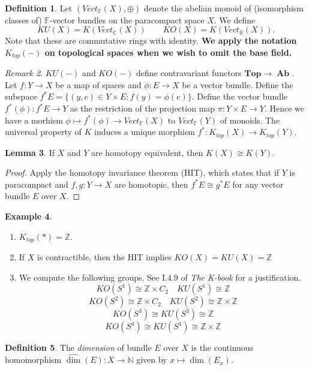 \documentclass[10pt,letterpaper,cm]{nupset}
\theoremstyle{definition}
\newtheorem{definition}{Definition}
\newtheorem{exmp}[definition]{Example}
\theoremstyle{theorem}
\newtheorem{lemma}[definition]{Lemma}
\theoremstyle{remark}
\newtheorem{remark}[definition]{Remark}
\newcommand{\C}{\mathbb C}
\newcommand{\F}{\mathbb F}
\newcommand{\N}{\mathbb N}
\newcommand{\R}{\mathbb R}
\newcommand{\Z}{\mathbb Z}
\newcommand{\1}{\mathbf{1}}
\newcommand{\0}{\vec 0}
\DeclareMathOperator{\Ab}{\mathbf{Ab}}
\begin{document}
\begin{definition}
Let $(Vect_{\F}(X), \oplus)$ denote the abelian monoid of (isomorphism classes of) $\F$-vector bundles on the paracompact space $X$. We define $$KU(X) = K(Vect_{\C}(X)) \quad \quad KO(X) = K(Vect_{\R}(X)).$$ Note that these are commutative rings with identity. \textbf{We apply the notation $K_{top}(-)$ on topological spaces when we wish to omit the base field.}
\end{definition}

\begin{remark}
$KU(-)$ and $KO(-)$ define contravariant functors $\mathbf{Top} \to \Ab$. Let $f: Y \to X$ be a map of spaces and $\phi : E \to X$ be a vector bundle. Define the subspace $f^{\ast}E = \{(y, e) \in Y \times E : f(y) = \phi(e)\}$.  Define the vector bundle $f^{\ast}(\phi) : f^{\ast}E \to Y$ as the restriction of the projection map $\pi : Y \times E \to Y$. Hence we have a morhism $\phi \mapsto f^{\ast}(\phi) \to Vect_{\F}(X)$ to $Vect_{\F}(Y)$ of monoids. The universal property of $K$ induces a unique morphism $f^{\ast}: K_{top}(X) \to K_{top}(Y)$.
\end{remark}

\begin{lemma}
If $X$ and $Y$ are homotopy equivalent, then $K(X) \cong K(Y)$.
\end{lemma}
\begin{proof}
Apply the homotopy invariance theorem (HIT), which states that if $Y$ is paracompact and $f, g: Y \to X$ are homotopic, then $f^{\ast}E \cong g^{\ast}E$ for any vector bundle $E$ over $X$.
\end{proof}

\begin{exmp} $ $
\begin{enumerate}
\item $K_{top}(\ast) = \Z$.
\item If $X$ is contractible, then the HIT implies $KO(X) = KU(X) = \Z$
\item We compute the following groups. See I.4.9 of \textit{The K-book} for a justification.
$$KO(S^1) \cong \Z \times C_2 \quad KU(S^1) \cong \Z$$ $$KO(S^2) \cong \Z \times C_2   \quad KU(S^2) \cong \Z \times \Z$$  $$KO(S^3) \cong KU(S^3) \cong \Z $$   $$ KO(S^4) \cong KU(S^4) \cong \Z \times \Z$$
\end{enumerate}
\end{exmp}


\begin{definition}
The \textit{dimension} of bundle $E$ over $X$ is the continuous homomorphism $\widehat{\dim}(E) : X \to \N$ given by $x \mapsto \dim(E_x)$.
\end{definition}
\end{document}
